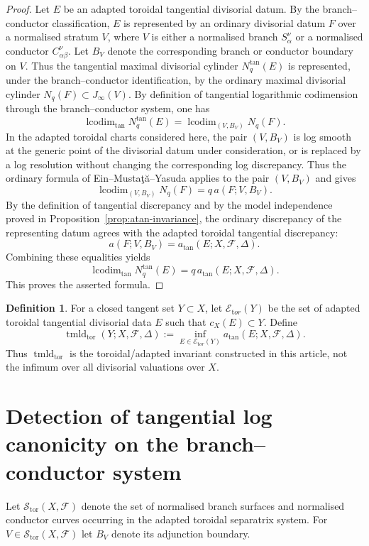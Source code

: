 \documentclass[11pt]{amsart}
\numberwithin{equation}{section}
\theoremstyle{plain}
\theoremstyle{definition}
\newtheorem{Definition}[Theorem]{Definition}
\newcommand{\tmldtor}{\operatorname{tmld}_{\mathrm{tor}}}
\newcommand{\lcodim}{\operatorname{lcodim}}
\newcommand{\cF}{\mathcal F}
\begin{document}
\begin{proof}
Let \(E\) be an adapted toroidal tangential divisorial datum. By the branch--conductor classification, \(E\) is represented by an ordinary divisorial datum \(F\) over a normalised stratum \(V\), where \(V\) is either a normalised branch \(S_\alpha^\nu\) or a normalised conductor \(C_{\alpha\beta}^\nu\). Let \(B_V\) denote the corresponding branch or conductor boundary on \(V\). Thus the tangential maximal divisorial cylinder \(N_q^{\tan}(E)\) is represented, under the branch--conductor identification, by the ordinary maximal divisorial cylinder \(N_q(F)\subset J_\infty(V)\).
By definition of tangential logarithmic codimension through the branch--conductor system, one has
\[
\lcodim_{\tan} N_q^{\tan}(E)
=
\lcodim_{(V,B_V)} N_q(F).
\]
In the adapted toroidal charts considered here, the pair $(V,B_V)$ is log smooth at the generic point of the divisorial datum under consideration, or is replaced by a log resolution without changing the corresponding log discrepancy.  Thus the ordinary formula of Ein--Musta\c{t}\u{a}--Yasuda \cite{EMY} applies to the pair $(V,B_V)$ and gives
\[
\lcodim_{(V,B_V)} N_q(F)
=
q\,a(F;V,B_V).
\]
By the definition of tangential discrepancy and by the model independence proved in Proposition~\ref{prop:atan-invariance}, the ordinary discrepancy of the representing datum agrees with the adapted toroidal tangential discrepancy:
\[
a(F;V,B_V)
=
a_{\tan}(E;X,\cF,\Delta).
\]
Combining these equalities yields
\[
\lcodim_{\tan} N_q^{\tan}(E)
=
q\,a_{\tan}(E;X,\cF,\Delta).
\]
This proves the asserted formula.
\end{proof}

\begin{Definition}
For a closed tangent set $Y\subset X$, let $\mathcal E_{\mathrm tor}(Y)$ be the set of adapted toroidal tangential divisorial data $E$ such that $c_X(E)\subset Y$. Define
\[
\tmldtor(Y;X,\cF,\Delta)
:=
\inf_{E\in\mathcal E_{\mathrm tor}(Y)}
a_{\tan}(E;X,\cF,\Delta).
\]
Thus $\tmldtor$ is the toroidal/adapted invariant constructed in this article, not the infimum over all divisorial valuations over $X$.
\end{Definition}

\section{Detection of tangential log canonicity on the branch--conductor system}
\label{sec:ioa}

Let $\mathcal S_{\mathrm{tor}}(X,\cF)$ denote the set of normalised branch surfaces and normalised conductor curves occurring in the adapted toroidal separatrix system.  For $V\in\mathcal S_{\mathrm{tor}}(X,\cF)$ let $B_V$ denote its adjunction boundary.
\end{document}
